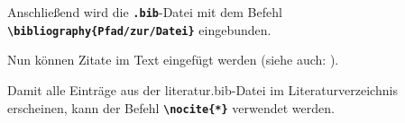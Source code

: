 Anschließend wird die \textbf{\texttt{.bib}}-Datei mit dem Befehl \textbf{\texttt{\textbackslash bibliography\{Pfad/zur/Datei\}}} eingebunden.

Nun können Zitate im Text eingefügt werden (siehe auch: ).

Damit alle Einträge aus der literatur.bib-Datei im Literaturverzeichnis erscheinen, kann der Befehl \textbf{\texttt{\textbackslash nocite\{*\}}} verwendet werden.